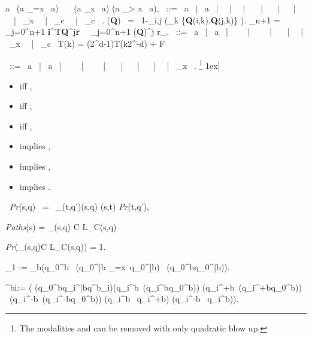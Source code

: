 \documentclass{llncs}
\newcommand{\where}{\ | \ }
\newcommand{\Paths}{\mbox{\sl Paths}}
\renewcommand{\Pr}{\mbox{\rm Pr}}
\renewcommand{\Pr}{\mbox{\sl Pr}}
\def\bfP{\mathbf{P}}
\newcommand{\Next}{\bigcirc \, }
\newcommand{\Until}{\mbox{}}
\newcommand{\U}{\Until}
\newcommand{\Release}{\mbox{}}
\newcommand{\X}{\Next}
\renewcommand{\L}{{\cal L}}
\renewcommand{\leq}{\leqslant}
\newcommand{\de}{\Diamond}
\begin{document}
\neg a \wedge \X (\neg a \U\!_{=x} \, a) 
\ \equiv \ 
\X (\neg a \U\!_{\leq x} \, a) \wedge (\neg a \U\!_{> x} \, a),
\label{pltl_d}
\varphi \ ::= \ a \where \neg a \where \varphi \wedge  \varphi \where \varphi  \vee  \varphi \where \X\! \varphi \where \varphi \U \varphi 
\where \varphi \Release \varphi 
\where \Box \varphi \where \de_{\leq x}  \, \varphi \where \de_{\leq c} \, \varphi \where \Box_{\leq c} \, \varphi. 
 \tau({\bf Q}) \ = \ 1-\displaystyle\min_{i,j} \left(\sum_k \min\{{\bf Q}(i,k),{\bf Q}(j,k)\} \right). \mu_{n+1}  =  \sum_{j=0}^{n+1} {\bf i}^T{\bf Q}^j{\bf r} \ \leq \ \sum_{j=0}^{n+1} \tau({\bf Q})^j r_{\max}.
\varphi \ ::= \ a \where \neg a \where \varphi \, \wedge \, \varphi \where \varphi \, \vee \, \varphi \where \X\! \varphi \where \de \varphi \where \de_{\leq x} \, \varphi \where \de_{\leq c} \, \varphi
\label{re}
T(k) = (2^d-1)\cdot T(k{\cdot}2^{{-}d}) + F

\varphi \ ::= \ a \where \neg a \where \varphi \, \wedge \, \varphi \where \varphi \, \vee \, \varphi \where \X\! \varphi \where \varphi \U \varphi 
\where \varphi \Release \varphi 
\where \Box \varphi \where \de_{\leq x} \, \varphi. \footnote{The modalities   and  can be removed with only quadratic blow up.}
1ex] \begin{minipage}{0.5\textwidth}
\begin{itemize}
    \item  iff ,
    \item  iff ,
    \item  iff ,
\end{itemize}
\end{minipage}
\begin{minipage}{0.5\textwidth}
\begin{itemize}
    \item  implies ,
    \item  implies ,
    \item  implies .
\end{itemize}
\end{minipage} \
\Pr(s,q) \ = \ \sum_{(t,q')\in \delta(s,q)} \bfP(s,t) \cdot \Pr(t,q'),

\Paths(s) = \bigcup_{(s,q) \in C} \L_C(s,q)
 
\Pr\bigg(\bigcup_{(s,q)\in C} \L_C(s,q)\bigg) = 1.

 \varphi_1 :=  \bigwedge_{b}\bigg(q_0^b \to \X(\neg q_0^{\bar b} \U\!_{=x}\ q_0^{\bar b}) \wedge \X(q_0^b\U q_0^{\bar b})\bigg).

 \varphi^{bi}:= \bigg( (q_0^b\to \neg q_i^{\bar b}\U q^b_i)\wedge (q_i^b\to \X(\neg q_i^b\U q_0^b)) \wedge (q_i^{+b}\to\X(\neg q_i^{+b}\U q_0^{b}))\\
                \wedge\ (q_i^{-b}\to\X(\neg q_i^{-b}\U q_0^{b})) \wedge (q_i^b \to \X q_i^{+b}) \wedge (q_i^{-b} \to \X q_i^b)\bigg).
  
\end{document}
